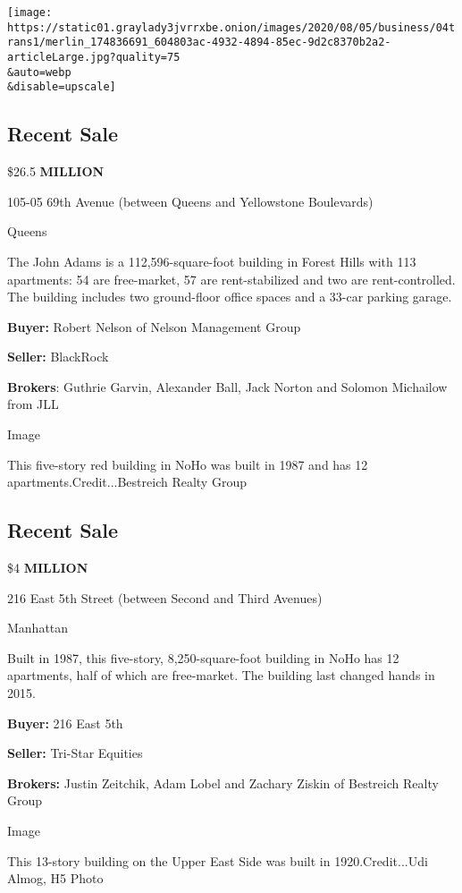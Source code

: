 \texttt{[image: https://static01.graylady3jvrrxbe.onion/images/2020/08/05/business/04trans1/merlin\_174836691\_604803ac-4932-4894-85ec-9d2c8370b2a2-articleLarge.jpg?quality=75\\\&auto=webp\\\&disable=upscale]}

\hypertarget{recent-sale}{%
\subsection{Recent Sale}\label{recent-sale}}

\$26.5 \textbf{MILLION}

105-05 69th Avenue (between Queens and Yellowstone Boulevards)

Queens

The John Adams is a 112,596-square-foot building in Forest Hills with
113 apartments: 54 are free-market, 57 are rent-stabilized and two are
rent-controlled. The building includes two ground-floor office spaces
and a 33-car parking garage.

\textbf{Buyer:} Robert Nelson of Nelson Management Group

\textbf{Seller:} BlackRock

\textbf{Brokers}: Guthrie Garvin, Alexander Ball, Jack Norton and
Solomon Michailow from JLL

Image

This five-story red building in NoHo was built in 1987 and has 12
apartments.Credit...Bestreich Realty Group

\hypertarget{recent-sale-1}{%
\subsection{Recent Sale}\label{recent-sale-1}}

\$4 \textbf{MILLION}

216 East 5th Street (between Second and Third Avenues)

Manhattan

Built in 1987, this five-story, 8,250-square-foot building in NoHo has
12 apartments, half of which are free-market. The building last changed
hands in 2015.

\textbf{Buyer:} 216 East 5th

\textbf{Seller:} Tri-Star Equities

\textbf{Brokers:} Justin Zeitchik, Adam Lobel and Zachary Ziskin of
Bestreich Realty Group

Image

This 13-story building on the Upper East Side was built in
1920.Credit...Udi Almog, H5 Photo


